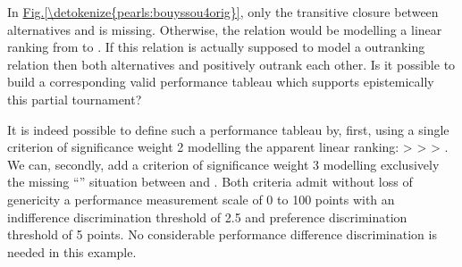 \documentclass[a4paper,12pt,english]{sphinxhowto}
\begin{document}
\sphinxAtStartPar
In \hyperref[\detokenize{pearls:bouyssou4orig}]{Fig.\@ \ref{\detokenize{pearls:bouyssou4orig}}}, only the transitive closure between alternatives  and  is missing. Otherwise, the relation would be modelling a linear ranking from  to . If this relation is actually supposed to model a  outranking relation then both alternatives  and  positively outrank each other. Is it possible to build a corresponding valid performance tableau which supports epistemically this partial tournament?

\sphinxAtStartPar
It is indeed possible to define such a performance tableau by, first, using a single criterion  of significance weight 2 modelling the apparent linear ranking:  \textgreater{}  \textgreater{}  \textgreater{} . We can, secondly, add a criterion  of significance weight 3 modelling exclusively the missing “” situation between  and . Both criteria admit without loss of genericity a performance measurement scale of 0 to 100 points with an indifference discrimination threshold of 2.5 and preference discrimination threshold of 5 points. No considerable performance difference discrimination is needed in this example.
\def\sphinxLiteralBlockLabel{\label{\detokenize{pearls:bouyssou4origpt}}}
%
\end{document}
